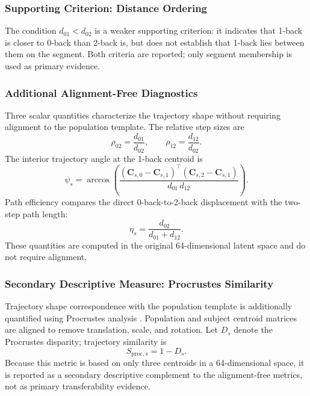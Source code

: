 \documentclass{ieeeaccess}
\begin{document}
\subsubsection{Supporting Criterion: Distance Ordering}
The condition $d_{01} < d_{02}$ is a weaker supporting criterion: it indicates
that 1-back is closer to 0-back than 2-back is, but does not establish
that 1-back lies between them on the segment. Both criteria are reported;
only segment membership is used as primary evidence.

\subsubsection{Additional Alignment-Free Diagnostics}
Three scalar quantities characterize the trajectory shape without requiring
alignment to the population template. The relative step sizes are
\begin{equation}
  \rho_{02} = \frac{d_{01}}{d_{02}}, \qquad
  \rho_{12} = \frac{d_{12}}{d_{02}}.
\end{equation}
The interior trajectory angle at the 1-back centroid is
\begin{equation}
  \psi_s = \arccos\!\left(
  \frac{(\mathbf{C}_{s,0}-\mathbf{C}_{s,1})^{\top}(\mathbf{C}_{s,2}-\mathbf{C}_{s,1})}
       {d_{01}\,d_{12}}\right).
  \label{eq:angle}
\end{equation}
Path efficiency compares the direct 0-back-to-2-back displacement with the
two-step path length:
\begin{equation}
  \eta_s = \frac{d_{02}}{d_{01} + d_{12}}.
  \label{eq:efficiency}
\end{equation}
These quantities are computed in the original 64-dimensional latent space
and do not require alignment.

\subsubsection{Secondary Descriptive Measure: Procrustes Similarity}
Trajectory shape correspondence with the population template is additionally
quantified using Procrustes analysis \cite{gower1975}. Population and subject
centroid matrices are aligned to remove translation, scale, and rotation.
Let $D_s$ denote the Procrustes disparity; trajectory similarity is
\begin{equation}
  S_{\mathrm{proc},s} = 1 - D_s.
  \label{eq:procrustes}
\end{equation}
Because this metric is based on only three centroids in a 64-dimensional
space, it is reported as a secondary descriptive complement to the
alignment-free metrics, not as primary transferability evidence.
\end{document}
